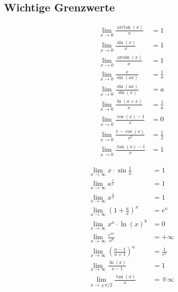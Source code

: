 \subsection{Wichtige Grenzwerte}
    \begin{minipage}{0.99\linewidth}
        \begin{minipage}{0.49\linewidth}
            \begin{align*}
                &\lim_{x \to 0} \frac{\arctan(x)}{x} &= 1\\
                &\lim_{x \to 0} \frac{\sin(x)}{x} &= 1\\
                &\lim_{x \to 0} \frac{\arcsin(x)}{x} &= 1\\
                &\lim_{x \to 0} \frac{x}{\sin(ax)} &= \frac{1}{a}\\
                &\lim_{x \to 0} \frac{\sin(ax)}{\sin(x)} &= a\\
                &\lim_{x \to 0} \frac{\ln(a+x)}{x} &= \frac{1}{a}\\
                &\lim_{x \to 0} \frac{\cos(x)-1}{x} &= 0\\
                &\lim_{x \to 0} \frac{1-\cos(x)}{x^2} &= \frac{1}{2}\\
                &\lim_{x \to 0} \frac{\tan(x)-1}{x} &= 1
            \end{align*}
        \end{minipage}
        \begin{minipage}{0.49\linewidth}
            \begin{align*}
                &\lim_{x \to \infty} x \cdot \sin{\frac{1}{x}} &= 1\\
                &\lim_{x \to \infty} a^{\frac{1}{x}} &= 1\\
                &\lim_{x \to \infty} x^{\frac{1}{x}} &= 1\\
                &\lim_{x \to \infty} \left(1+\frac{a}{x}\right)^x &= e^a\\
                &\lim_{x \to \infty} x^a \cdot \ln(x)^b &= 0\\
                &\lim_{x \to \infty} \frac{e^{ax}}{x^b} &= + \infty\\
                &\lim_{x \to \infty} \left(\frac{n-1}{n+1}\right)^n &= \frac{1}{e^2}\\
                &\lim_{x \to \infty} \frac{\ln(x)}{x-1} &= 1\\
                &\lim_{x \to \pm \pi/2} \frac{\tan(x)}{x} &= \mp \infty\\
            \end{align*}
        \end{minipage}
    \end{minipage}